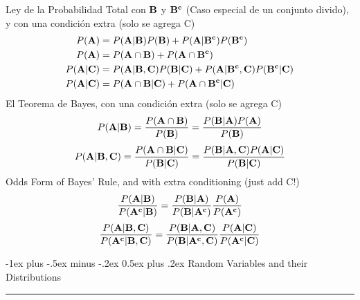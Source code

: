 \documentclass[10pt,landscape]{article}
\makeatletter
\renewcommand{\section}{\@startsection{section}{1}{0mm}%
                                {-1ex plus -.5ex minus -.2ex}%
                                {0.5ex plus .2ex}%
                                {\normalfont\large\bfseries}}
\renewcommand{\subsection}{\@startsection{subsection}{2}{0mm}%
                                {-1explus -.5ex minus -.2ex}%
                                {0.5ex plus .2ex}%
                                {\normalfont\normalsize\bfseries}}
\makeatother
\begin{document}
\begin{multicols}{3}
Ley de la Probabilidad Total con ${\bf B}$ y ${\bf B^c}$ (Caso especial de un conjunto divido), y con una condición extra (solo se agrega C)
   \begin{align*} 
P({\bf A}) &= P({\bf A} | {\bf B})P({\bf B}) + P({\bf A} | {\bf B^c})P({\bf B^c}) \\
P({\bf A}) &= P({\bf A} \cap {\bf B})+ P({\bf A} \cap {\bf B^c}) \\
P({\bf A} | {\bf C}) &= P({\bf A} | {\bf B}, {\bf C})P({\bf B} | {\bf C}) + P({\bf A} | {\bf B^c}, {\bf C})P({\bf B^c} | {\bf C}) \\
P({\bf A} | {\bf C}) &= P({\bf A} \cap {\bf B} | {\bf C})+ P({\bf A} \cap {\bf B^c} | {\bf C})
   \end{align*} 
El Teorema de Bayes, con una condición extra (solo se agrega C)
         \[P({\bf A}|{\bf B}) = \frac{P({\bf A} \cap {\bf B})}{P({\bf B})} = \frac{P({\bf B}|{\bf A})P({\bf A})}{P({\bf B})}\]
         \[P({\bf A}|{\bf B}, {\bf C}) = \frac{P({\bf A} \cap {\bf B} | {\bf C})}{P({\bf B} | {\bf C})} = \frac{P({\bf B}|{\bf A}, {\bf C})P({\bf A} | {\bf C})}{P({\bf B} | {\bf C})}\]
Odds Form of Bayes' Rule, and with extra conditioning (just add C!)
\[\frac{P({\bf A}| {\bf B})}{P({\bf A^c}| {\bf B})} = \frac{P({\bf B}|{\bf A})}{P({\bf B}| {\bf A^c})}\frac{P({\bf A})}{P({\bf A^c})}\]
\[\frac{P({\bf A}| {\bf B}, {\bf C})}{P({\bf A^c}| {\bf B}, {\bf C})} = \frac{P({\bf B}|{\bf A}, {\bf C})}{P({\bf B}| {\bf A^c}, {\bf C})}\frac{P({\bf A} | {\bf C})}{P({\bf A^c} | {\bf C})}\]

\section{Random Variables and their Distributions}\smallskip \hrule height 2pt \smallskip


   

\end{multicols}
\end{document}
